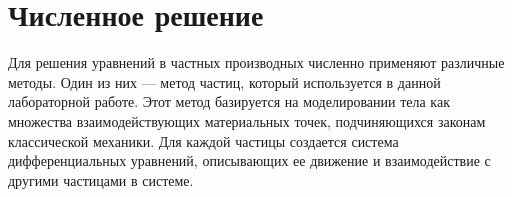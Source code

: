 \pagebreak

\section{Численное решение}
	Для решения уравнений в частных производных численно применяют различные методы. Один из них — метод частиц, который используется в данной лабораторной работе. Этот метод базируется на моделировании тела как множества взаимодействующих материальных точек, подчиняющихся законам классической механики. Для каждой частицы создается система дифференциальных уравнений, описывающих ее движение и взаимодействие с другими частицами в системе.

\pagebreak
